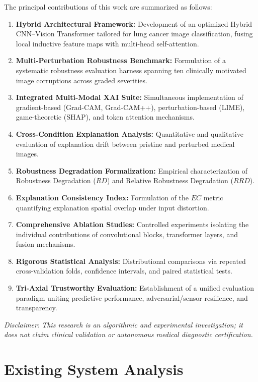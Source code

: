 \documentclass[conference]{IEEEtran}
\begin{document}
The principal contributions of this work are summarized as follows:
\begin{enumerate}
    \item \textbf{Hybrid Architectural Framework:} Development of an optimized Hybrid CNN--Vision Transformer tailored for lung cancer image classification, fusing local inductive feature maps with multi-head self-attention.
    \item \textbf{Multi-Perturbation Robustness Benchmark:} Formulation of a systematic robustness evaluation harness spanning ten clinically motivated image corruptions across graded severities.
    \item \textbf{Integrated Multi-Modal XAI Suite:} Simultaneous implementation of gradient-based (Grad-CAM, Grad-CAM++), perturbation-based (LIME), game-theoretic (SHAP), and token attention mechanisms.
    \item \textbf{Cross-Condition Explanation Analysis:} Quantitative and qualitative evaluation of explanation drift between pristine and perturbed medical images.
    \item \textbf{Robustness Degradation Formalization:} Empirical characterization of Robustness Degradation ($RD$) and Relative Robustness Degradation ($RRD$).
    \item \textbf{Explanation Consistency Index:} Formulation of the $EC$ metric quantifying explanation spatial overlap under input distortion.
    \item \textbf{Comprehensive Ablation Studies:} Controlled experiments isolating the individual contributions of convolutional blocks, transformer layers, and fusion mechanisms.
    \item \textbf{Rigorous Statistical Analysis:} Distributional comparisons via repeated cross-validation folds, confidence intervals, and paired statistical tests.
    \item \textbf{Tri-Axial Trustworthy Evaluation:} Establishment of a unified evaluation paradigm uniting predictive performance, adversarial/sensor resilience, and transparency.
\end{enumerate}
\textit{Disclaimer: This research is an algorithmic and experimental investigation; it does not claim clinical validation or autonomous medical diagnostic certification.}

\section{Existing System Analysis}
\label{sec:existing_system}
\end{document}
